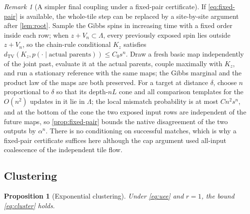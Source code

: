 \documentclass[11pt]{article}
\theoremstyle{plain}
\newtheorem{proposition}[theorem]{Proposition}
\theoremstyle{definition}
\theoremstyle{remark}
\newtheorem{remark}[theorem]{Remark}
\newcommand{\dtv}{d_{\mathrm{TV}}}
\newcommand{\Lam}{\Lambda}
\begin{document}
\begin{remark}[A simpler final coupling under a fixed-pair certificate]
\label{rem:simpler}
If \eqref{eq:fixed-pair} is available, the whole-tile step can be replaced by a site-by-site argument after \cref{lem:root}. Sample the Gibbs spins in increasing time with a fixed order inside each row; when $z+V_n\subset\Lam$, every previously exposed spin lies outside $z+V_n$, so the chain-rule conditional $K_z$ satisfies $\dtv(K_z,p(\cdot\mid\text{actual parents}))\le C_0s^n$. Draw a fresh basic map independently of the joint past, evaluate it at the actual parents, couple maximally with $K_z$, and run a stationary reference with the same maps; the Gibbs marginal and the product law of the maps are both preserved. For a target at distance $\delta$, choose $n$ proportional to $\delta$ so that its depth-$nL$ cone and all comparison templates for the $O(n^2)$ updates in it lie in $\Lam$; the local mismatch probability is at most $Cn^2s^n$, and at the bottom of the cone the two exposed input rows are independent of the future maps, so \cref{prop:fixed-pair} bounds the native disagreement of the two outputs by $\alpha^n$. There is no conditioning on successful matches, which is why a fixed-pair certificate suffices here although the cap argument used all-input coalescence of the independent tile flow.
\end{remark}

\subsection{Clustering}

\begin{proposition}[Exponential clustering]
\label{prop:cluster}
Under \eqref{eq:uee} and $r=1$, the bound \eqref{eq:cluster} holds.
\end{proposition}
\end{document}

